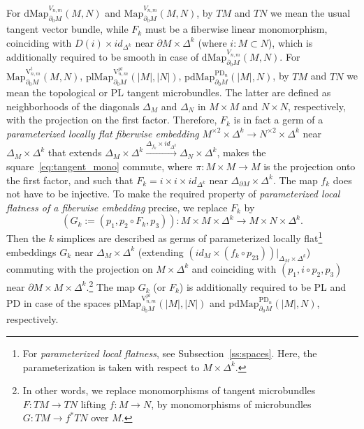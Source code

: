 \documentclass[11pt]{amsart}
\theoremstyle{definition}
\newcommand{\Map}{\mathrm{Map}}
\newcommand{\dMap}{\mathrm{dMap}}
\newcommand{\plMap}{\mathrm{plMap}}
\newcommand{\pdMap}{\mathrm{pdMap}}
\newcommand{\PD}{\mathrm{PD}}
\newcommand{\VV}{\mathrm{V}}
\numberwithin{equation}{section}
\begin{document}
For  $\dMap_{\partial_0M}^{V_{n,m}}(M,N)$ and $\Map_{\partial_0M}^{V_{n,m}}(M,N)$, by $TM$ and $TN$ we mean the usual tangent vector bundle,
while $F_k$ must be a fiberwise linear monomorphism, coinciding with $D(i)\times id_{\Delta^k}$ near $\partial M\times\Delta^k$ (where $i\colon M\subset N$), which is additionally required to be smooth in case of $\dMap_{\partial_0M}^{V_{n,m}}(M,N)$. 
For $\Map_{\partial_0M}^{\VV_{n,m}^t}(M,N)$, $\plMap_{\partial_0M}^{\VV_{n,m}^{pl}}(|M|,|N|)$, $\pdMap_{\partial_0M}^{\PD_n}(|M|,N)$,
by $TM$ and $TN$ we mean the topological or PL tangent microbundles. The latter are defined as  neighborhoods of the diagonals $\Delta_M$ and $\Delta_N$ in
$M\times M$ and  $N\times N$, respectively, with the projection on the first factor. Therefore, $F_k$ is in fact a germ of a {\it parameterized  locally flat fiberwise embedding} $M^{\times 2}\times
\Delta^k\to N^{\times 2}
\times\Delta^k$ near $\Delta_M\times \Delta^k$ that extends
 $\Delta_M\times \Delta^k\xrightarrow{\Delta_{f_k}\times id_{\Delta^k}} \Delta_N\times\Delta^k$, makes the square~\eqref{eq:tangent_mono} commute,
where $\pi\colon M\times M\to M$ is the projection onto the first factor, and such that $F_k=i\times i\times id_{\Delta^k}$ near $\Delta_{\partial M}\times \Delta^k$. The map $f_k$ does not have to be injective.  
To make the required property of {\it parameterized  local flatness of a fiberwise embedding} precise, we replace $F_k$ by 
$$\left(G_k:=(p_1,p_2\circ F_k,p_3)\right)\colon M\times M\times\Delta^k\to
M\times N\times\Delta^k.$$ %
 Then the $k$ simplices are described as germs of parameterized locally flat\footnote{For {\it parameterized local flatness}, see Subsection~\ref{ss:spaces}. 
Here, the parameterization is taken with respect to $M\times\Delta^k$.} embeddings $G_k$ near $\Delta_M\times\Delta^k$ (extending
$\left(id_M\times (f_k\circ p_{23})\right)|_{\Delta_M\times\Delta^k}$) commuting with the projection on $M\times\Delta^k$ and coinciding with $(p_1,i\circ p_2,p_3)$ near $\partial M\times M\times\Delta^k$.\footnote{In other words, we replace monomorphisms of tangent microbundles $F\colon TM\to TN$ lifting $f\colon M\to N$,
by monomorphisms of microbundles $G\colon TM\to f^*TN$ over $M$.\label{footnote_imm}} The map $G_k$ (or $F_k$)  is additionally required to be PL and PD in case of the spaces $\plMap_{\partial_0M}^{\VV_{n,m}^{pl}}(|M|,|N|)$
and  $\pdMap_{\partial_0M}^{\PD_n}(|M|,N)$, respectively. 
\end{document}
